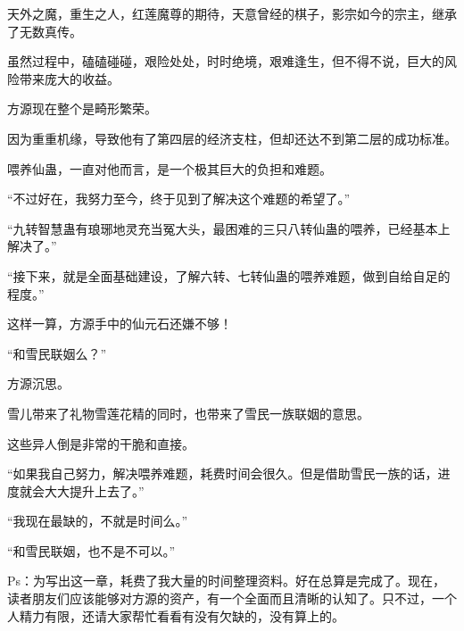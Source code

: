 \begin{this_body}
天外之魔，重生之人，红莲魔尊的期待，天意曾经的棋子，影宗如今的宗主，继承了无数真传。

虽然过程中，磕磕碰碰，艰险处处，时时绝境，艰难逢生，但不得不说，巨大的风险带来庞大的收益。

方源现在整个是畸形繁荣。

因为重重机缘，导致他有了第四层的经济支柱，但却还达不到第二层的成功标准。

喂养仙蛊，一直对他而言，是一个极其巨大的负担和难题。

“不过好在，我努力至今，终于见到了解决这个难题的希望了。”

“九转智慧蛊有琅琊地灵充当冤大头，最困难的三只八转仙蛊的喂养，已经基本上解决了。”

“接下来，就是全面基础建设，了解六转、七转仙蛊的喂养难题，做到自给自足的程度。”

这样一算，方源手中的仙元石还嫌不够！

“和雪民联姻么？”

方源沉思。

雪儿带来了礼物雪莲花精的同时，也带来了雪民一族联姻的意思。

这些异人倒是非常的干脆和直接。

“如果我自己努力，解决喂养难题，耗费时间会很久。但是借助雪民一族的话，进度就会大大提升上去了。”

“我现在最缺的，不就是时间么。”

“和雪民联姻，也不是不可以。”

Ps：为写出这一章，耗费了我大量的时间整理资料。好在总算是完成了。现在，读者朋友们应该能够对方源的资产，有一个全面而且清晰的认知了。只不过，一个人精力有限，还请大家帮忙看看有没有欠缺的，没有算上的。

\end{this_body}

